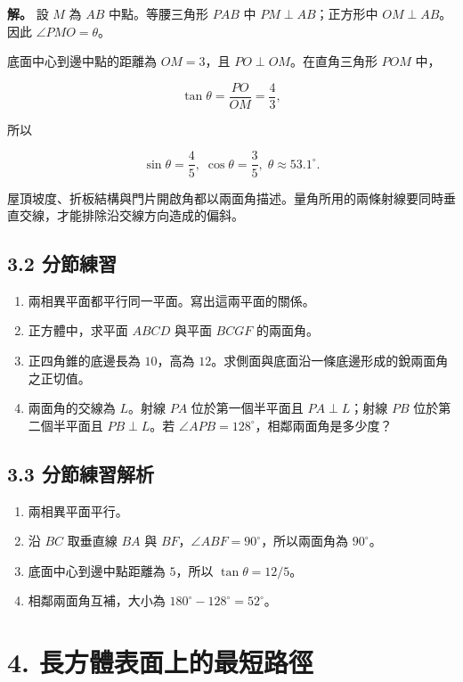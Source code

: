 \documentclass[11pt,a4paper]{article}
\providecommand{\tightlist}{%
  \setlength{\itemsep}{0pt}\setlength{\parskip}{0pt}}
\begin{document}
\textbf{解。} 設 \(M\) 為 \(AB\) 中點。等腰三角形 \(PAB\) 中 \(PM\perp AB\)；正方形中 \(OM\perp AB\)。因此 \(\angle PMO=\theta\)。

底面中心到邊中點的距離為 \(OM=3\)，且 \(PO\perp OM\)。在直角三角形 \(POM\) 中，

\[
\tan\theta=\frac{PO}{OM}=\frac43,
\]

所以

\[
\sin\theta=\frac45,\; \cos\theta=\frac35,
\; \theta\approx53.1^\circ.
\]

屋頂坡度、折板結構與門片開啟角都以兩面角描述。量角所用的兩條射線要同時垂直交線，才能排除沿交線方向造成的偏斜。

\subsection{3.2 分節練習}\label{ux5206ux7bc0ux7df4ux7fd2-2}

\begin{enumerate}
\def\labelenumi{\arabic{enumi}.}
\tightlist
\item
  兩相異平面都平行同一平面。寫出這兩平面的關係。
\item
  正方體中，求平面 \(ABCD\) 與平面 \(BCGF\) 的兩面角。
\item
  正四角錐的底邊長為 \(10\)，高為 \(12\)。求側面與底面沿一條底邊形成的銳兩面角之正切值。
\item
  兩面角的交線為 \(L\)。射線 \(PA\) 位於第一個半平面且 \(PA\perp L\)；射線 \(PB\) 位於第二個半平面且 \(PB\perp L\)。若 \(\angle APB=128^\circ\)，相鄰兩面角是多少度？
\end{enumerate}

\subsection{3.3 分節練習解析}\label{ux5206ux7bc0ux7df4ux7fd2ux89e3ux6790-2}

\begin{enumerate}
\def\labelenumi{\arabic{enumi}.}
\tightlist
\item
  兩相異平面平行。
\item
  沿 \(BC\) 取垂直線 \(BA\) 與 \(BF\)，\(\angle ABF=90^\circ\)，所以兩面角為 \(90^\circ\)。
\item
  底面中心到邊中點距離為 \(5\)，所以 \(\tan\theta=12/5\)。
\item
  相鄰兩面角互補，大小為 \(180^\circ-128^\circ=52^\circ\)。
\end{enumerate}

\section{4. 長方體表面上的最短路徑}\label{ux9577ux65b9ux9ad4ux8868ux9762ux4e0aux7684ux6700ux77edux8defux5f91}
\end{document}
